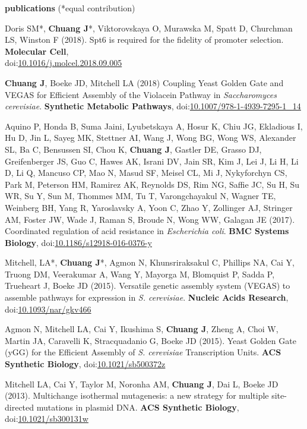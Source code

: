 \documentclass[11pt, a4paper]{article}
\begin{document}
\vspace{0.8cm}
\textbf{\Large publications} (*equal contribution)
\begin{description}[topsep=2pt, align=right, leftmargin=*, labelsep=0pt]
    \item [2018 ] Doris SM*, \textbf{Chuang J}*, Viktorovskaya O, Murawska M, Spatt D, Churchman LS, Winston F (2018). Spt6 is required for the fidelity of promoter selection. \textbf{Molecular Cell},\\doi:\href{https://doi.org/10.1016/j.molcel.2018.09.005}{10.1016/j.molcel.2018.09.005}
    \item [2018 ] \textbf{Chuang J}, Boeke JD, Mitchell LA (2018) Coupling Yeast Golden Gate and VEGAS for Efficient Assembly of the Violacein Pathway in \textit{Saccharomyces cerevisiae}. \textbf{Synthetic Metabolic Pathways}, doi:\href{https://doi.org/10.1007/978-1-4939-7295-1_14}{10.1007/978-1-4939-7295-1\_14}
    \item [2017 ] Aquino P, Honda B, Suma Jaini, Lyubetskaya A, Hosur K, Chiu JG, Ekladious I, Hu D, Jin L, Sayeg MK, Stettner AI, Wang J, Wong BG, Wong WS, Alexander SL, Ba C, Bensussen SI, Chou K, \textbf{Chuang J}, Gastler DE, Grasso DJ, Greifenberger JS, Guo C, Hawes AK, Israni DV, Jain SR, Kim J, Lei J, Li H, Li D, Li Q, Mancuso CP, Mao N, Masud SF, Meisel CL, Mi J, Nykyforchyn CS, Park M, Peterson HM, Ramirez AK, Reynolds DS, Rim NG, Saffie JC, Su H, Su WR, Su Y, Sun M, Thommes MM, Tu T, Varongchayakul N, Wagner TE, Weinberg BH, Yang R, Yaroslavsky A, Yoon C, Zhao Y, Zollinger AJ, Stringer AM, Foster JW, Wade J, Raman S, Broude N, Wong WW, Galagan JE (2017). Coordinated regulation of acid resistance in \textit{Escherichia coli}. \textbf{BMC Systems Biology}, doi:\href{https://doi.org/10.1186/s12918-016-0376-y}{10.1186/s12918-016-0376-y}
    \item [2015 ] Mitchell, LA*, \textbf{Chuang J}*, Agmon N, Khunsriraksakul C, Phillips NA, Cai Y, Truong DM, Veerakumar A, Wang Y, Mayorga M, Blomquist P, Sadda P, Trueheart J, Boeke JD (2015). Versatile genetic assembly system (VEGAS) to assemble pathways for expression in \textit{S. cerevisiae}. \textbf{Nucleic Acids Research}, doi:\href{https://doi.org/10.1093/nar/gkv466}{10.1093/nar/gkv466}
    \item [2015 ] Agmon N, Mitchell LA, Cai Y, Ikushima S, \textbf{Chuang J}, Zheng A, Choi W, Martin JA, Caravelli K, Stracquadanio G, Boeke JD (2015). Yeast Golden Gate (yGG) for the Efficient Assembly of \textit{S. cerevisiae} Transcription Units. \textbf{ACS Synthetic Biology}, doi:\href{https://doi.org/10.1021/sb500372z}{10.1021/sb500372z}
    \item [2013 ] Mitchell LA, Cai Y, Taylor M, Noronha AM, \textbf{Chuang J}, Dai L, Boeke JD (2013). Multichange isothermal mutagenesis: a new strategy for multiple site-directed mutations in plasmid DNA. \textbf{ACS Synthetic Biology}, doi:\href{https://doi.org/10.1021/sb300131w}{10.1021/sb300131w}
\end{description}
\end{document}
